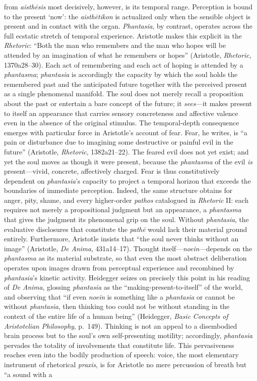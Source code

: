 \documentclass{article}
\begin{document}
from \textit{aisth\={e}sis} most decisively, however, is its temporal range. Perception is bound to the present `now': the \textit{aisth\={e}tikon} is actualized only when the sensible object is present and in contact with the organ. \textit{Phantasia}, by contrast, operates across the full ecstatic stretch of temporal experience. Aristotle makes this explicit in the \textit{Rhetoric}: ``Both the man who remembers and the man who hopes will be attended by an imagination of what he remembers or hopes'' (Aristotle, \textit{Rhetoric}, 1370a28--30). Each act of remembering and each act of hoping is attended by a \textit{phantasma}; \textit{phantasia} is accordingly the capacity by which the soul holds the remembered past and the anticipated future together with the perceived present as a single phenomenal manifold. The soul does not merely recall a proposition about the past or entertain a bare concept of the future; it \textit{sees}---it makes present to itself an appearance that carries sensory concreteness and affective valence even in the absence of the original stimulus. The temporal-depth consequence emerges with particular force in Aristotle's account of fear. Fear, he writes, is ``a pain or disturbance due to imagining some destructive or painful evil in the future'' (Aristotle, \textit{Rhetoric}, 1382a21--22). The feared evil does not yet exist; and yet the soul moves as though it were present, because the \textit{phantasma} of the evil \textit{is} present---vivid, concrete, affectively charged. Fear is thus constitutively dependent on \textit{phantasia}'s capacity to project a temporal horizon that exceeds the boundaries of immediate perception. Indeed, the same structure obtains for anger, pity, shame, and every higher-order \textit{pathos} catalogued in \textit{Rhetoric} II: each requires not merely a propositional judgment but an appearance, a \textit{phantasma} that gives the judgment its phenomenal grip on the soul. Without \textit{phantasia}, the evaluative disclosures that constitute the \textit{path\={e}} would lack their material ground entirely. Furthermore, Aristotle insists that ``the soul never thinks without an image'' (Aristotle, \textit{De Anima}, 431a14--17). Thought itself---\textit{noein}---depends on the \textit{phantasma} as its material substrate, so that even the most abstract deliberation operates upon images drawn from perceptual experience and recombined by \textit{phantasia}'s kinetic activity. Heidegger seizes on precisely this point in his reading of \textit{De Anima}, glossing \textit{phantasia} as the ``making-present-to-itself'' of the world, and observing that ``if even \textit{noein} is something like a \textit{phantasia} or cannot be without \textit{phantasia}, then thinking too could not be without standing in the context of the entire life of a human being'' (Heidegger, \textit{Basic Concepts of Aristotelian Philosophy}, p.~149). Thinking is not an appeal to a disembodied brain process but to the soul's own self-presenting motility; accordingly, \textit{phantasia} pervades the totality of involvements that constitute life. This pervasiveness reaches even into the bodily production of speech: voice, the most elementary instrument of rhetorical \textit{praxis}, is for Aristotle no mere percussion of breath but ``a sound with a 
\end{document}

